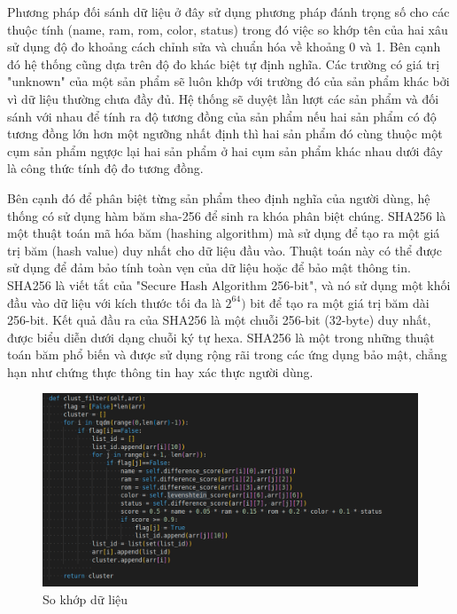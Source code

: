 \documentclass[../DoAn.tex]{subfiles}
\begin{document}
Phương pháp đối sánh dữ liệu ở đây sử dụng phương pháp đánh trọng số cho các thuộc tính (name, ram, rom, color, status) trong đó việc so khớp tên của hai xâu sử dụng độ đo khoảng cách chỉnh sửa và chuẩn hóa về khoảng 0 và 1. Bên cạnh đó hệ thống cũng dựa trên độ đo khác biệt tự định nghĩa. Các trường có giá trị "unknown" của một sản phẩm sẽ luôn khớp với trường đó của sản phẩm khác bởi vì dữ liệu thường chưa đầy đủ. Hệ thống sẽ duyệt lần lượt các sản phẩm và đối sánh với nhau để tính ra độ tương đồng của sản phẩm nếu hai sản phẩm có độ tương đồng lớn hơn một ngưỡng nhất định thì hai sản phẩm đó cùng thuộc một cụm sản phẩm ngựợc lại hai sản phẩm ở hai cụm sản phẩm khác nhau dưới đây là công thức tính độ đo tương đồng.

Bên cạnh đó để phân biệt từng sản phẩm theo định nghĩa của người dùng, hệ thống có sử dụng hàm băm sha-256 để sinh ra khóa phân biệt chúng. SHA256 là một thuật toán mã hóa băm (hashing algorithm) mà sử dụng để tạo ra một giá trị băm (hash value) duy nhất cho dữ liệu đầu vào. Thuật toán này có thể được sử dụng để đảm bảo tính toàn vẹn của dữ liệu hoặc để bảo mật thông tin. SHA256 là viết tắt của "Secure Hash Algorithm 256-bit", và nó sử dụng một khối đầu vào dữ liệu với kích thước tối đa là 
$2^{64})$ bit để tạo ra một giá trị băm dài 256-bit. Kết quả đầu ra của SHA256 là một chuỗi 256-bit (32-byte) duy nhất, được biểu diễn dưới dạng chuỗi ký tự hexa. SHA256 là một trong những thuật toán băm phổ biến và được sử dụng rộng rãi trong các ứng dụng bảo mật, chẳng hạn như chứng thực thông tin hay xác thực người dùng. 

\begin{figure}[H]
    \centering
    \includegraphics[scale=0.42]{Hinhve/data_matching.png}
    \caption{So khớp dữ liệu}
    \label{fig:my_label2}
\end{figure}
\end{document}
